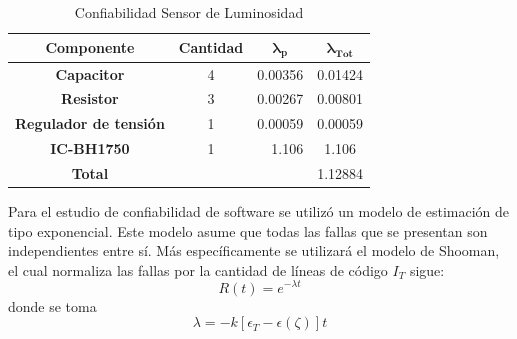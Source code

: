 \begin{table}[H]
\centering
\begin{tabular}{|c|crc|}
\hline
\textbf{Componente}           & \multicolumn{1}{c|}{\textbf{Cantidad}} & \multicolumn{1}{c|}{$\boldsymbol{\lambda_p}$}        & $\boldsymbol{\lambda_{Tot}}$ \\ \hline
\textbf{Capacitor}            & \multicolumn{1}{c|}{4}                 & \multicolumn{1}{r|}{0.00356}                         & 0.01424                      \\ \hline
\textbf{Resistor}             & \multicolumn{1}{c|}{3}                 & \multicolumn{1}{r|}{\cellcolor[HTML]{FFFFFF}0.00267} & 0.00801                      \\ \hline
\textbf{Regulador de tensión} & \multicolumn{1}{c|}{1}                 & \multicolumn{1}{r|}{\cellcolor[HTML]{FFFFFF}0.00059} & 0.00059                      \\ \hline
\textbf{IC-BH1750}            & \multicolumn{1}{c|}{1}                 & \multicolumn{1}{r|}{1.106}                           & 1.106                        \\ \hline
\textbf{Total}                & \multicolumn{1}{l}{}                   & \multicolumn{1}{l}{}                                 & \multicolumn{1}{r|}{1.12884} \\ \hline
\end{tabular}
\caption{Confiabilidad Sensor de Luminosidad}
\label{tab:conflum}
\end{table}

Para el estudio de confiabilidad de software se utilizó un modelo de estimación de tipo exponencial. Este modelo asume que todas las fallas que se presentan son independientes entre sí. Más específicamente se utilizará el modelo de Shooman, el cual normaliza las fallas por la cantidad de líneas de código $I_T$ sigue:
\begin{equation}
	R(t) = e^{-\lambda t}
\end{equation}
donde se toma
\begin{equation}
	\lambda = -k \left[ \epsilon_T - \epsilon(\zeta) \right]t
\end{equation}

